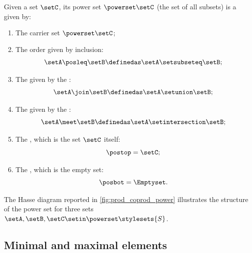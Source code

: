 \begin{ctdefinition}
    \label{def:power-set-as-lattice}
    Given a set $\setC$, its power set $\powerset \setC$ (the set of all subsets) is a  given by:

    \constit
    \begin{enumerate}
        \item The carrier set $\powerset \setC$;
        \item The order given by inclusion:
              \begin{equation}
                  \setA\posleq \setB \definedas \setA\setsubseteq \setB;
              \end{equation}
        \item The  given by the :
              \begin{equation}
                  \setA\join \setB \definedas \setA\setunion \setB;
              \end{equation}
        \item The  given by the :
              \begin{equation}
                  \setA\meet \setB \definedas \setA\setintersection \setB;
              \end{equation}
        \item The , which is the set $\setC$ itself:
              \begin{equation}
                  \postop = \setC;
              \end{equation}
        \item The , which is the empty set:
              \begin{equation}
                  \posbot = \Emptyset.
              \end{equation}
    \end{enumerate}
\end{ctdefinition}

\begin{marginfigure}
    \centering
    \caption{}
    \label{fig:prod_coprod_power}
\end{marginfigure}

The Hasse diagram reported in \cref{fig:prod_coprod_power} illustrates the structure of the power set  for three sets~$\setA,\setB,\setC\setin \powerset \stylesets{S}$.


\subsection{Minimal and maximal elements}

